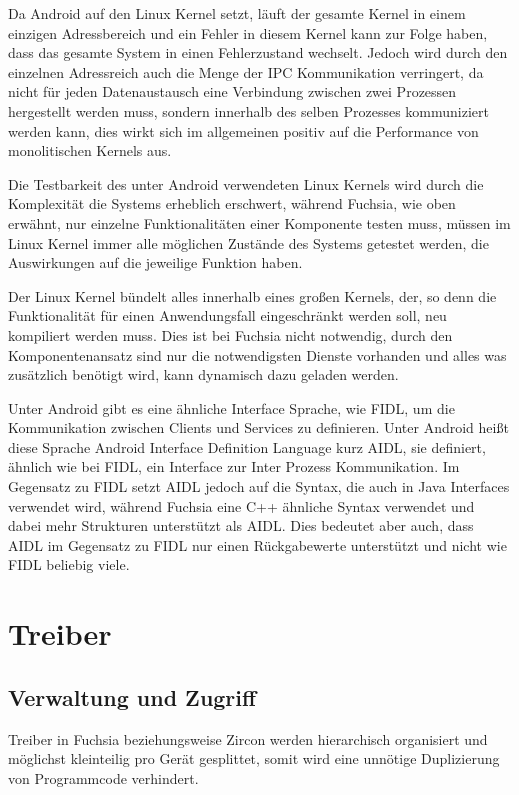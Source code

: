 \documentclass[a4paper]{scrartcl}
\begin{document}
Da Android auf den Linux Kernel setzt, läuft der gesamte Kernel in einem einzigen Adressbereich und ein Fehler in diesem Kernel kann zur Folge haben, dass das gesamte System in einen Fehlerzustand wechselt. Jedoch wird durch den einzelnen Adressreich auch die Menge der IPC Kommunikation verringert, da nicht für jeden Datenaustausch eine Verbindung zwischen zwei Prozessen hergestellt werden muss, sondern innerhalb des selben Prozesses kommuniziert werden kann, dies wirkt sich im allgemeinen positiv auf die Performance von monolitischen Kernels aus.

Die Testbarkeit des unter Android verwendeten Linux Kernels wird durch die Komplexität die Systems erheblich erschwert, während Fuchsia, wie oben erwähnt, nur einzelne Funktionalitäten einer Komponente testen muss, müssen im Linux Kernel immer alle möglichen Zustände des Systems getestet werden, die Auswirkungen auf die jeweilige Funktion haben.

Der Linux Kernel bündelt alles innerhalb eines großen Kernels, der, so denn die Funktionalität für einen Anwendungsfall eingeschränkt werden soll, neu kompiliert werden muss. Dies ist bei Fuchsia nicht notwendig, durch den Komponentenansatz sind nur die notwendigsten Dienste vorhanden und alles was zusätzlich benötigt wird, kann dynamisch dazu geladen werden.

Unter Android gibt es eine ähnliche Interface Sprache, wie FIDL, um die Kommunikation zwischen Clients und Services zu definieren. Unter Android heißt diese Sprache Android Interface Definition Language kurz AIDL, sie definiert, ähnlich wie bei FIDL, ein Interface zur Inter Prozess Kommunikation. Im Gegensatz zu FIDL setzt AIDL jedoch auf die Syntax, die auch in Java Interfaces verwendet wird, während Fuchsia eine C++ ähnliche Syntax verwendet und dabei mehr Strukturen unterstützt als AIDL. Dies bedeutet aber auch, dass AIDL im Gegensatz zu FIDL nur einen Rückgabewerte unterstützt und nicht wie FIDL beliebig viele.
\section{Treiber}
\subsection{Verwaltung und Zugriff}
Treiber in Fuchsia beziehungsweise Zircon werden hierarchisch organisiert und möglichst kleinteilig pro Gerät gesplittet, somit wird eine unnötige Duplizierung von Programmcode verhindert.
\end{document}
